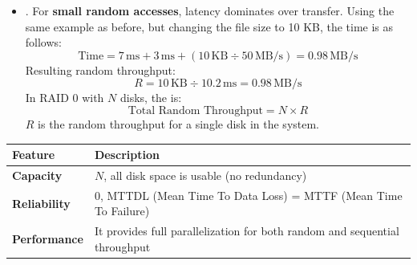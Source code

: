 \begin{itemize}
    \item {}. For \textbf{small random accesses}, latency dominates over transfer. Using the same example as before, but changing the file size to 10 KB, the time is as follows:
    \begin{equation*}
        \text{Time} = 7\,\text{ms} + 3\,\text{ms} + \left( 10\,\text{KB} \div 50\,\text{MB/s} \right) = 0.98\,\text{MB/s}
    \end{equation*}
    Resulting random throughput:
    \begin{equation*}
        R = 10\,\text{KB} \div 10.2\,\text{ms} = 0.98\,\text{MB/s}
    \end{equation*}
    In RAID 0 with $N$ disks, the  is:
    \begin{equation}
        \text{Total Random Throughput} = N \times R
    \end{equation}
    $R$ is the random throughput for a single disk in the system.
\end{itemize}

\begin{table}[!htp]
    \centering
    \begin{adjustbox}{width={0.9\textwidth},totalheight={\textheight},keepaspectratio}
        \begin{tabular}{@{} l | p{27em} @{}}
            \toprule
            Feature & Description \\
            \midrule
            \textbf{Capacity}       & $N$, all disk space is usable (no redundancy) \\ [.3em]
            \textbf{Reliability}    & 0, MTTDL (Mean Time To Data Loss) = MTTF (Mean Time To Failure) \\ [.3em]
            \textbf{Performance}    & It provides full parallelization for both random and sequential throughput \\
            \bottomrule
        \end{tabular}
    \end{adjustbox}
\end{table}

\newpage

